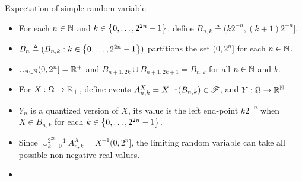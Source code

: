 \documentclass[12pt,aspectratio=169]{beamer}
\begin{document}
\begin{frame}{Expectation of simple random variable}
\begin{Proof}
\begin{itemize}
\item <1-> For each $n \in \mathbb{N}$ and $k \in \left\{0, \dots, 2^{2n}-1\right\}$, 
define $B_{n,k} \triangleq (k2^{-n}, (k+1)2^{-n}]$. 
\item <2-> $B_n \triangleq (B_{n,k}: k \in \left\{0, \dots, 2^{2n}-1\right\})$ partitions the set $(0, 2^n]$ for each $n \in \mathbb{N}$. 
\item <3-> $\cup_{n \in \mathbb{N}}(0, 2^n] = \mathbb{R}^+$ and $B_{n+1,2k}\cup B_{n+1,2k+1} = B_{n,k}$ for all $n \in \mathbb{N}$ and $k$. 
\item <4-> For $X: \Omega \to \mathbb{R}_+$, 
define events $A^X_{n,k} = X^{-1}(B_{n,k}) \in \mathscr{F}$, 
and $Y: \Omega\to\mathbb{R}_+^{\mathbb{N}}$ 
\end{itemize}
\end{Proof}
\end{frame}

\begin{frame}
\begin{Proof}
\begin{itemize}
\item <1-> $Y_n$ is a quantized version of $X$, its value is the left end-point $k2^{-n}$ when $X \in B_{n,k}$ for each $k \in \left\{0, \dots, 2^{2n}-1\right\}$.  
\item <2-> Since $\cup_{k=0}^{2^{2n}-1}A^X_{n,k} = X^{-1}(0, 2^n]$, 
the limiting random variable can take all possible non-negative real values. 
\item <3-> 
\end{itemize}
\end{Proof}
\end{frame}
\end{document}
